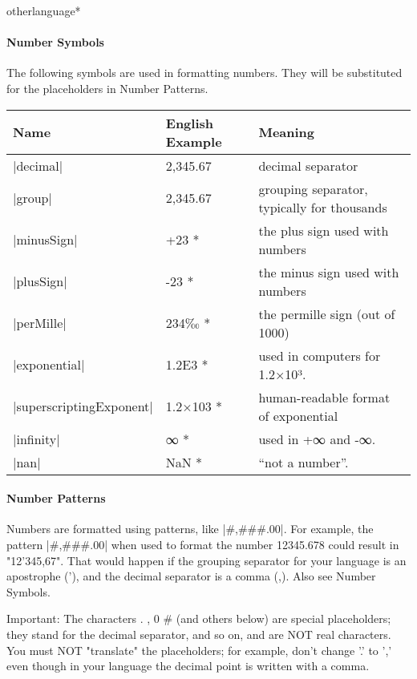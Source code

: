 \begin{docCommandd}{otherlanguage*} { }
\paragraph{Number Symbols} The following symbols are used in formatting numbers. They will be substituted for the placeholders in Number Patterns. 

\begin{longtable}{llp{5cm}}
\toprule
Name	&English Example	&Meaning\\
\midrule
|decimal|	  &2,345.67	 &decimal separator\\
|group|	     &2,345.67	 &grouping separator, typically for thousands\\
|minusSign|  &	+23	*	 &the plus sign used with numbers\\
|plusSign|	  &-23	*	    &the minus sign used with numbers\\ 
|perMille|	  &234‰	*	&the permille sign (out of 1000)\\
|exponential|	      &1.2E3	*	&used in computers for 1.2×10³.\\
|superscriptingExponent|	&1.2×103	* &human-readable format of exponential \\
|infinity|	  &∞	*	&used in +∞ and -∞.\\ 
|nan|	     &NaN	*	&\enquote{not a number}. \\
\bottomrule
\end{longtable}



\paragraph{Number Patterns}

Numbers are formatted using patterns, like |#,###.00|. For example, the pattern |#,###.00| when used to format the number 12345.678 could result in "12'345,67". That would happen if the grouping separator for your language is an apostrophe ('), and the decimal separator is a comma (,).  Also see Number Symbols.

Important: The characters . , 0 \# (and others below) are special placeholders; they stand for the decimal separator, and so on, and are NOT real characters. You must NOT "translate" the placeholders; for example, don't change '.' to ',' even though in your language the decimal point is written with a comma.


\end{docCommandd}
